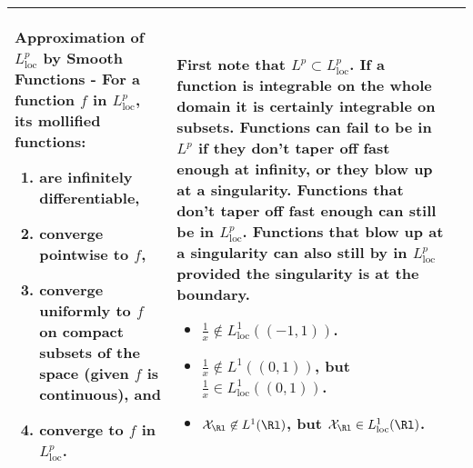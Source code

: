 \begin{longtable}{|*{3}{>{\centering\arraybackslash}p{}|}}
            \textbf{Approximation of $L^p_{\text{loc}}$ by Smooth Functions} - For a function $f$ in $L^p_{\text{loc}}$, its mollified functions:
            \begin{enumerate}
                \item
                    are infinitely differentiable,
                \item
                    converge pointwise to $f$,
                \item
                    converge uniformly to $f$ on compact subsets of the space (given $f$ is continuous), and
                \item
                    converge to $f$ in $L^p_{\text{loc}}$.
            \end{enumerate}
            &
            First note that $L^p \subset L^p_\text{loc}$.  If a function is integrable on the whole domain it is certainly integrable on subsets.  Functions can fail to be in $L^p$ if they don't taper off fast enough at infinity, or they blow up at a singularity.  Functions that don't taper off fast enough can still be in $L^p_\text{loc}$.  Functions that blow up at a singularity can also still by in $L^p_\text{loc}$ provided the singularity is at the boundary.
            \begin{itemize}
                \item $\frac{1}{x} \not\in L^1_\text{loc}((-1,1))$.
                \item $\frac{1}{x} \not\in L^1((0,1))$, but $\frac{1}{x} \in L^1_\text{loc}((0,1))$.
                \item $\mathcal{X}_\Rl \not\in L^1(\Rl)$, but $\mathcal{X}_\Rl \in L^1_\text{loc}(\Rl)$.
            \end{itemize}
            \\[6pt] \hline
    \bottomrule
\end{longtable}